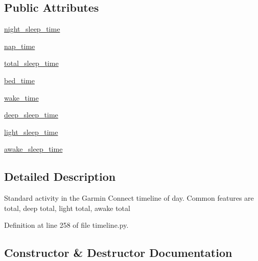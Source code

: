\subsection*{Public Attributes}
\begin{DoxyCompactItemize}
\item 
\hyperlink{classpygce_1_1models_1_1garmin_1_1timeline_1_1_g_c_day_sleep_a4f8e3dadd2689156a80a21698b426e03}{night\+\_\+sleep\+\_\+time}
\item 
\hyperlink{classpygce_1_1models_1_1garmin_1_1timeline_1_1_g_c_day_sleep_af5aefe888d858cd929d598544802f2a8}{nap\+\_\+time}
\item 
\hyperlink{classpygce_1_1models_1_1garmin_1_1timeline_1_1_g_c_day_sleep_a4942fa038d25a7af4c0793da1b3abf86}{total\+\_\+sleep\+\_\+time}
\item 
\hyperlink{classpygce_1_1models_1_1garmin_1_1timeline_1_1_g_c_day_sleep_a25002c89e8687bc2a88ea5da386332cd}{bed\+\_\+time}
\item 
\hyperlink{classpygce_1_1models_1_1garmin_1_1timeline_1_1_g_c_day_sleep_abb2351f921e38ff370e1ad0822957553}{wake\+\_\+time}
\item 
\hyperlink{classpygce_1_1models_1_1garmin_1_1timeline_1_1_g_c_day_sleep_a95ebbbd000c531843a8a7fa7f8788f72}{deep\+\_\+sleep\+\_\+time}
\item 
\hyperlink{classpygce_1_1models_1_1garmin_1_1timeline_1_1_g_c_day_sleep_a49295ce80915e2012694a35edbf7ad7d}{light\+\_\+sleep\+\_\+time}
\item 
\hyperlink{classpygce_1_1models_1_1garmin_1_1timeline_1_1_g_c_day_sleep_aefd01be519ebb8192b0887941b66eda0}{awake\+\_\+sleep\+\_\+time}
\end{DoxyCompactItemize}


\subsection{Detailed Description}
\begin{DoxyVerb}Standard activity in the Garmin Connect timeline of day.
Common features are total, deep total, light total, awake total
\end{DoxyVerb}
 

Definition at line 258 of file timeline.\+py.



\subsection{Constructor \& Destructor Documentation}
\mbox{\label{classpygce_1_1models_1_1garmin_1_1timeline_1_1_g_c_day_sleep_a58d1e0c8797955f8d88f1e662dc9ec76}} 
